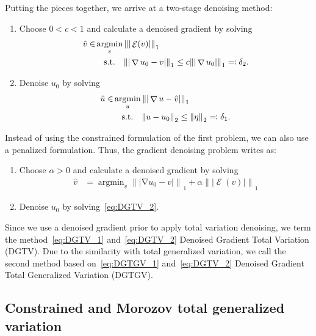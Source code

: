 \documentclass[twocolumn,envcountsame]{svjour3}
\newcommand{\norm}[2][]{{\|{#2}\|_{}}_{#1}}
\newcommand{\abs}[1]{|#1|}
\newcommand{\subjectto}{\text{\quad s.t.\quad }}
\DeclareMathOperator*{\argmin}{argmin}
\DeclareMathOperator{\grad}{\nabla}
\DeclareMathOperator{\symgrad}{\mathcal{E}}
\begin{document}
Putting the pieces together, we arrive at a two-stage denoising 
method:
\begin{enumerate}
\item	Choose $0<c<1$ and calculate a denoised gradient by solving
		\begin{align}\label{eq:DGTV_1}
		\begin{split}
			\hat{v} \in &\argmin_v \norm[1]{\abs{\symgrad(v)}}\\
				&\subjectto\norm[1]{\abs{\grad u_0 - v}}
				\leq c\norm[1]{\abs{\grad u_0}}\eqqcolon
				\delta_2.
		\end{split}
		\end{align}
\item Denoise $u_{0}$ by solving
		\begin{align}\label{eq:DGTV_2}
		\begin{split}
			\hat{u} \in &\argmin_u \norm[1]{\abs{\grad u - \hat{v}}}\\
				&\subjectto  \norm[2]{u-u_0}\leq 
				\norm[2]{\eta}\eqqcolon \delta_1.
		\end{split}
		\end{align}
\end{enumerate}
Instead of using the constrained formulation of the first 
problem, we can also use a penalized formulation. Thus, the 
gradient denoising problem writes as:
\begin{enumerate}
\item Choose $\alpha>0$ and calculate a denoised gradient by solving
		\begin{align}\label{eq:DGTGV_1}
			\hat{v} &= \argmin_v \norm[1]{\abs{\grad u_0 - v}}
				+ \alpha \norm[1]{\abs{\symgrad(v)}}
		\end{align}
\item Denoise $u_{0}$ by solving~\eqref{eq:DGTV_2}.
\end{enumerate}

Since we use a denoised gradient prior to apply total variation denoising, we term the method~\eqref{eq:DGTV_1} and~\eqref{eq:DGTV_2} Denoised Gradient Total Variation (DGTV).
Due to the similarity with total generalized variation, we call the second method based on~\eqref{eq:DGTGV_1} and~\eqref{eq:DGTV_2} Denoised Gradient Total Generalized Variation (DGTGV).


\subsection{Constrained and Morozov total generalized variation}
\label{sec:ctgv}
\end{document}
